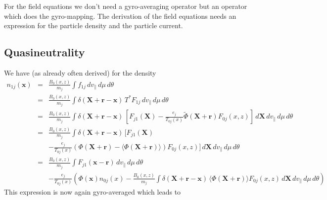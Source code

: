 For the field equations we don't need a gyro-averaging operator but an
operator which does the gyro-mapping. The derivation of the field
equations needs an expression for the particle density and the
particle current. 

\subsection{Quasineutrality}
\label{sec:quasineutrality}
We have (as already often derived) for the density
\begin{eqnarray*}
  n_{1j}(\mathbf{x}) &=& \frac{B_0(x,z)}{m_j}\int f_{1j}\,dv_\|\,d\mu\,d\theta\\
  &=& \frac{B_0(x,z)}{m_j}\int \delta(\mathbf{X}+\mathbf{r}-\mathbf{x})\,T^*F_{1j}\,dv_\|\,d\mu\,d\theta\\
  &=& \frac{B_0(x,z)}{m_j}\int
  \delta(\mathbf{X}+\mathbf{r}-\mathbf{x})\,\left[
    F_{j1}(\mathbf{X})
    -\frac{e_j}{T_{0j}(x)}\tilde\Phi(\mathbf{X}+\mathbf{r}) F_{0j}(x,z)
  \right]\,d\mathbf{X}\,dv_\|\,d\mu\,d\theta\\
  &=& \frac{B_0(x,z)}{m_j}\int
  \delta(\mathbf{X}+\mathbf{r}-\mathbf{x})\,\Bigg[
    F_{j1}(\mathbf{X})\\
    &&-\frac{e_j}{T_{0j}(x)}\left(\Phi(\mathbf{X}+\mathbf{r})-\langle\Phi(\mathbf{X}+\mathbf{r})\rangle\right) F_{0j}(x,z)
  \Bigg]\,d\mathbf{X}\,dv_\|\,d\mu\,d\theta\\
  &=& \frac{B_0(x,z)}{m_j}\int F_{j1}(\mathbf{x}-\mathbf{r})\,dv_\|\,d\mu\,d\theta\\
  &&-\frac{e_j}{T_{0j}(x)}\left(
    \Phi(\mathbf{x}) n_{0j}(x)
    -\frac{B_0(x,z)}{m_j}\int\delta(\mathbf{X}+\mathbf{r}-\mathbf{x})\,\langle\Phi(\mathbf{X}+\mathbf{r})\rangle
    F_{0j}(x,z)\,d\mathbf{X}\,dv_\|\,d\mu\,d\theta
  \right) 
\end{eqnarray*}
This expression is now again gyro-averaged which leads to
